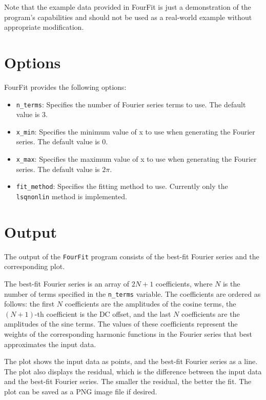 \documentclass{article}
\begin{document}
Note that the example data provided in FourFit is just a demonstration of the program's capabilities and should not be used as a real-world example without appropriate modification.

\section{Options}
FourFit provides the following options:
\begin{itemize}
    \item \texttt{n\_terms}: Specifies the number of Fourier series terms to use. The default value is 3.
    \item \texttt{x\_min}: Specifies the minimum value of x to use when generating the Fourier series. The default value is 0.
    \item \texttt{x\_max}: Specifies the maximum value of x to use when generating the Fourier series. The default value is $2\pi$.
    \item \texttt{fit\_method}: Specifies the fitting method to use. Currently only the \texttt{lsqnonlin} method is implemented.
\end{itemize}

\section{Output}
The output of the \texttt{FourFit} program consists of the best-fit Fourier series and the corresponding plot.

The best-fit Fourier series is an array of $2N+1$ coefficients, where $N$ is the number of terms specified in the \texttt{n\_terms} variable. The coefficients are ordered as follows: the first $N$ coefficients are the amplitudes of the cosine terms, the $(N+1)$-th coefficient is the DC offset, and the last $N$ coefficients are the amplitudes of the sine terms. The values of these coefficients represent the weights of the corresponding harmonic functions in the Fourier series that best approximates the input data.

The plot shows the input data as points, and the best-fit Fourier series as a line. The plot also displays the residual, which is the difference between the input data and the best-fit Fourier series. The smaller the residual, the better the fit. The plot can be saved as a PNG image file if desired.
\end{document}

